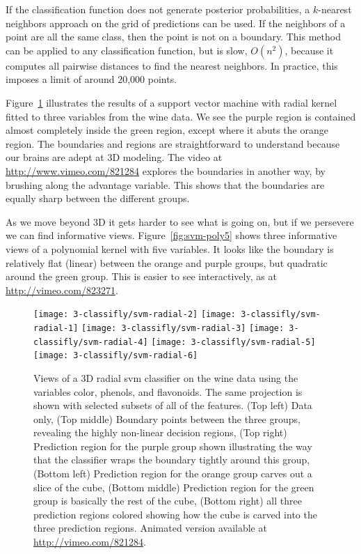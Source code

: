 \documentclass[preprint]{imsart}
\begin{document}
If the classification function does not generate posterior probabilities, a $k$-nearest neighbors approach on the grid of predictions can be used. If the neighbors of a point are all the same class, then the point is not on a boundary.  This method can be applied to any classification function, but is slow, $O(n^2)$, because it computes all pairwise distances to find the nearest neighbors.  In practice, this imposes a limit of around 20,000 points.

Figure~\ref{fig:svm-radial3} illustrates the results of a support vector machine \citep{cortes:1995} with radial kernel fitted to three variables from the wine data.  We see the purple region is contained almost completely inside the green region, except where it abuts the orange region. The boundaries and regions are straightforward to understand because our brains are adept at 3D modeling. The video at \url{http://www.vimeo.com/821284} explores the boundaries in another way, by brushing along the advantage variable. This shows that the boundaries are equally sharp between the different groups.

As we move beyond 3D it gets harder to see what is going on, but if we persevere we can find informative views. Figure~\ref{fig:svm-poly5} shows three informative views of a polynomial kernel with five variables.  It looks like the boundary is relatively flat (linear) between the orange and purple groups, but quadratic around the green group.  This is easier to see interactively, as at \url{http://vimeo.com/823271}.

\begin{figure}[htbp]
  \centering
    \texttt{[image: 3-classifly/svm-radial-2]}
    \texttt{[image: 3-classifly/svm-radial-1]}
    \texttt{[image: 3-classifly/svm-radial-3]}
    \texttt{[image: 3-classifly/svm-radial-4]}
    \texttt{[image: 3-classifly/svm-radial-5]}
    \texttt{[image: 3-classifly/svm-radial-6]}
  \caption{Views of a 3D radial {\sc svm} classifier on the wine data using the variables color, phenols, and flavonoids. The same projection is shown with selected subsets of all of the features. (Top left) Data only, (Top middle) Boundary points between the three groups, revealing the highly non-linear decision regions, (Top right) Prediction region for the purple group shown illustrating the way that the classifier wraps the boundary tightly around this group, (Bottom left) Prediction region for the orange group carves out a slice of the cube, (Bottom middle) Prediction region for the green group is basically the rest of the cube, (Bottom right) all three prediction regions colored showing how the cube is carved into the three prediction regions.  Animated version available at \url{http://vimeo.com/821284}.}
  \label{fig:svm-radial3}
\end{figure}
\end{document}
